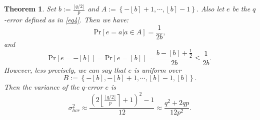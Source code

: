 \documentclass{cta-author}
\newtheorem{theorem}{Theorem}{}
\begin{document}
\begin{theorem} \label{theo1}
	Set $b:=\frac{\lfloor q/2 \rfloor}{p}$ and $A:=\left\{ -\left\lfloor b \right \rceil+1, \cdots, \left\lfloor b \right \rceil -1 \right\}$. Also let $e$ be the $q$-error defined as in \eqref{eq4}. Then we have:
	$$ \mathrm{Pr}[e=a|a \in A]= \frac{1}{2b},$$ 
	and 
	$$\mathrm{Pr}[e=-\left\lfloor b \right \rceil]=\mathrm{Pr}[e=\left\lfloor b \right \rceil]= \frac{b-\left \lfloor b\right \rceil +\frac{1}{2}}{2b}\leq \frac{1}{2b}.$$
	However, less precisely, we can say that $e$ is uniform over $$B:=\left\{-\left\lfloor b \right \rceil,  -\left\lfloor b \right \rceil+1, \cdots, \left\lfloor b \right \rceil -1, \left\lfloor b \right \rceil \right \}.$$
	Then the variance of the $q$-error $e$ is
	\begin{equation}\label{key}
	\sigma_{lwr}^2 \approx \frac{\left (2\left \lfloor \frac{\lfloor q/2 \rfloor}{p} \right \rceil +1 \right)^2-1}{12} \approx \frac{q^2+2qp}{12p^2}.
	\end{equation} 
\end{theorem}
\end{document}
